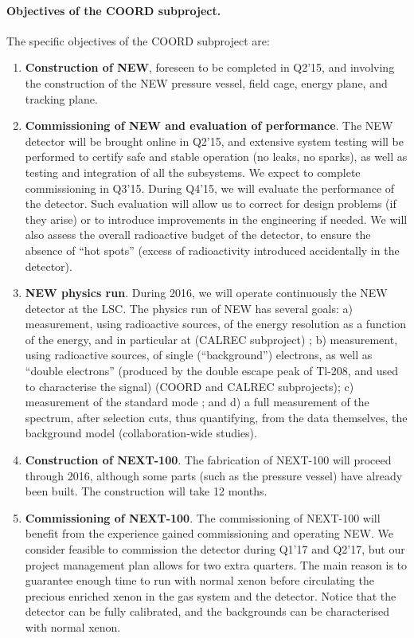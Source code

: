 \paragraph{Objectives of the COORD subproject.}
The specific objectives of the COORD subproject are:

\begin{enumerate}
\item {\bf Construction of NEW}, foreseen to be completed in Q2'15, and involving the construction of the NEW pressure vessel, field cage, energy plane, and tracking plane.

\item {\bf Commissioning of NEW and evaluation of performance}. The NEW detector will be brought online in Q2'15, and extensive system testing will be performed to certify safe and stable operation (no leaks, no sparks), as well as testing and integration of all the subsystems. We expect to complete commissioning in Q3'15.
During Q4'15, we will evaluate the performance of the detector. Such evaluation will allow us to correct for design problems (if they arise) or to introduce improvements in the engineering if needed. We will also assess the overall radioactive budget of the detector, to ensure the absence of ``hot spots'' (excess of radioactivity introduced accidentally in the detector). 

\item {\bf NEW physics run}. During 2016, we will operate continuously the NEW detector at the LSC. The physics run of NEW has several goals: a) measurement, using radioactive sources, of the energy resolution as a function of the energy, and in particular at \Qbb (CALREC subproject) ; b) measurement, using radioactive sources, of single (``background'') electrons, as well as ``double electrons'' (produced by the double escape peak of Tl-208, and used to characterise the signal) (COORD and CALREC subprojects); c) measurement of the standard mode \bbtnu; and d) a full measurement of the spectrum, after selection cuts, thus quantifying, from the data themselves, the background model (collaboration-wide studies). 
%

\item {\bf Construction of NEXT-100}. The fabrication of NEXT-100 will proceed through 2016, although some parts (such as the pressure vessel) have already been built. The construction will take 12 months. 

\item {\bf Commissioning of NEXT-100}. The commissioning of NEXT-100 will benefit from the experience gained commissioning and operating NEW. We consider feasible to commission the detector during Q1'17 and Q2'17, but our project management plan allows for two extra quarters. The main reason is to guarantee enough time to run with normal xenon before circulating the precious enriched xenon in the gas system and the detector. Notice that the detector can be fully calibrated, and the backgrounds can be characterised with normal xenon.  


\end{enumerate}
